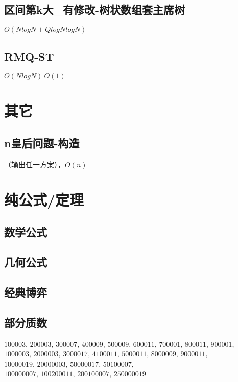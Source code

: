 \documentclass[10pt]{article}
\begin{document}
\subsection{区间第k大\_有修改-树状数组套主席树}
$O(NlogN+QlogNlogN)$


\subsection{RMQ-ST}
$O(NlogN)~O(1)$

\section{其它}
\subsection{n皇后问题-构造}
（输出任一方案），$O(n)$

\section{纯公式/定理}
\subsection{数学公式}


\subsection{几何公式}


\subsection{经典博弈}


\subsection{部分质数}
\noindent
$100003$, $200003$, $300007$, $400009$, $500009$, $600011$, $700001$, $800011$, $900001$, \\
$1000003$, $2000003$, $3000017$, $4100011$, $5000011$, $8000009$, $9000011$, \\
$10000019$, $20000003$, $50000017$, $50100007$, \\
$100000007$, $100200011$, $200100007$, $250000019$
\end{document}
